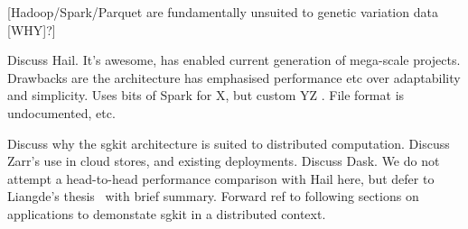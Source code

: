 \documentclass[a4paper,num-refs]{oup-contemporary}
\begin{document}
[Hadoop/Spark/Parquet are fundamentally unsuited to genetic
variation data [WHY]?]

Discuss Hail. It's awesome, has enabled current
generation of mega-scale projects. Drawbacks are the
architecture has emphasised performance etc over adaptability
and simplicity. Uses bits of Spark for X, but custom YZ .
File format is undocumented, etc.

Discuss why the sgkit architecture is suited to distributed
computation. Discuss Zarr's use in cloud stores, and existing
deployments. Discuss Dask.
We do not attempt a head-to-head performance comparison with
Hail here, but defer to Liangde's thesis~\citep{li2022efficient}
with brief summary.
Forward ref to following sections on applications to demonstate
sgkit in a distributed context.
\end{document}
